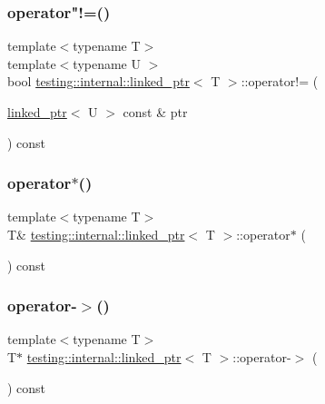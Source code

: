 \subsubsection{\texorpdfstring{operator"!=()}{operator!=()}\hspace{0.1cm}{\footnotesize\ttfamily [2/2]}}
{\footnotesize\ttfamily template$<$typename T$>$ \\
template$<$typename U $>$ \\
bool \hyperlink{classtesting_1_1internal_1_1linked__ptr}{testing\+::internal\+::linked\+\_\+ptr}$<$ T $>$\+::operator!= (\begin{DoxyParamCaption}\item[{\hyperlink{classtesting_1_1internal_1_1linked__ptr}{linked\+\_\+ptr}$<$ U $>$ const \&}]{ptr }\end{DoxyParamCaption}) const\hspace{0.3cm}{\ttfamily [inline]}}

\mbox{\label{classtesting_1_1internal_1_1linked__ptr_ac94ad266bf41cbf979a95ca2870908d9}} 
\subsubsection{\texorpdfstring{operator$\ast$()}{operator*()}}
{\footnotesize\ttfamily template$<$typename T$>$ \\
T\& \hyperlink{classtesting_1_1internal_1_1linked__ptr}{testing\+::internal\+::linked\+\_\+ptr}$<$ T $>$\+::operator$\ast$ (\begin{DoxyParamCaption}{ }\end{DoxyParamCaption}) const\hspace{0.3cm}{\ttfamily [inline]}}

\mbox{\label{classtesting_1_1internal_1_1linked__ptr_a23ff85ac97eed03e945034b65c8eb900}} 
\subsubsection{\texorpdfstring{operator-\/$>$()}{operator->()}}
{\footnotesize\ttfamily template$<$typename T$>$ \\
T$\ast$ \hyperlink{classtesting_1_1internal_1_1linked__ptr}{testing\+::internal\+::linked\+\_\+ptr}$<$ T $>$\+::operator-\/$>$ (\begin{DoxyParamCaption}{ }\end{DoxyParamCaption}) const\hspace{0.3cm}{\ttfamily [inline]}}

